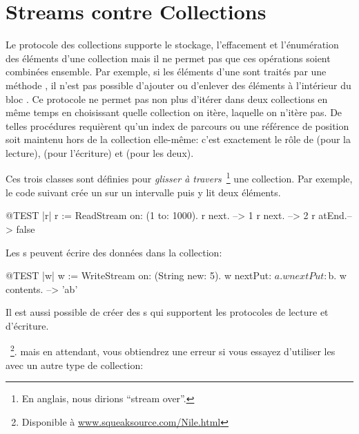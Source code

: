 \documentclass[a4paper,10pt,twoside]{book}
\begin{document}
\section{Streams contre Collections}

Le protocole des collections supporte le stockage, l'effacement et l'énumération
des éléments d'une collection mais il ne permet pas que ces opérations
soient combinées ensemble. Par exemple, si les éléments d'une 
 sont traités par une méthode , il n'est pas possible d'ajouter ou d'enlever des éléments à l'intérieur du bloc .
Ce protocole ne permet pas non plus d'itérer dans deux collections
en même temps en choisissant quelle collection on itère, laquelle on n'itère pas.
De telles procédures requièrent qu'un index de parcours ou une référence
de position soit maintenu hors de la collection elle-même:
c'est exactement le rôle de  
 (pour la lecture),  (pour l'écriture) et  (pour les deux).

Ces trois classes sont définies pour \emph{glisser à travers}~\footnote{En anglais, nous dirions ``stream over''.} une collection.
Par exemple, le code suivant crée un \stream sur un intervalle puis y lit deux éléments.
\begin{code}{@TEST |r|}
r := ReadStream on: (1 to: 1000).
r next.   --> 1
r next.   --> 2
r atEnd.--> false
\end{code}

Les s peuvent écrire des données dans la collection:
\begin{code}{@TEST |w|}
w := WriteStream on: (String new: 5).
w nextPut: $a.
w nextPut: $b.
w contents. -->  'ab'
\end{code}

Il est aussi possible de créer des s qui supportent
les protocoles de lecture et d'écriture.

~\footnote{Disponible à \url{www.squeaksource.com/Nile.html}}. 
mais en attendant, vous obtiendrez une erreur
si vous essayez d'utiliser les \streams avec un autre type de collection:
\end{document}
